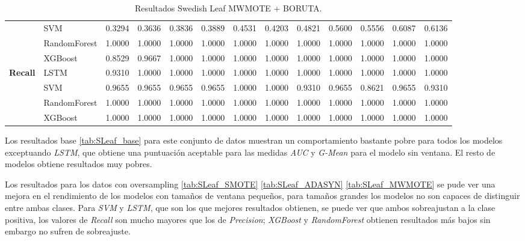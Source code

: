 \begin{table}[h]
\begin{adjustbox}{max width=15cm}
\begin{tabular}{|c|l|r|r|r|r|r|r|r|r|r|r|r|}
			& SVM &  0.3294 &  0.3636 &  0.3836 &  0.3889 &  0.4531 &  0.4203 &  0.4821 &  0.5600 &  0.5556 &  0.6087 &  0.6136 \\
			& RandomForest &  1.0000 &  1.0000 &  1.0000 &  1.0000 &  1.0000 &  1.0000 &  1.0000 &  1.0000 &  1.0000 &  1.0000 &  1.0000 \\
			& XGBoost &  0.8529 &  0.9667 &  1.0000 &  1.0000 &  1.0000 &  1.0000 &  1.0000 &  1.0000 &  1.0000 &  1.0000 &  1.0000 \\
			\hline
			\textbf{Recall} & LSTM &  0.9310 &  1.0000 &  1.0000 &  1.0000 &  1.0000 &  1.0000 &  1.0000 &  1.0000 &  1.0000 &  1.0000 &  1.0000 \\
			& SVM &  0.9655 &  0.9655 &  0.9655 &  0.9655 &  1.0000 &  1.0000 &  0.9310 &  0.9655 &  0.8621 &  0.9655 &  0.9310 \\
			& RandomForest &  1.0000 &  1.0000 &  1.0000 &  1.0000 &  1.0000 &  1.0000 &  1.0000 &  1.0000 &  1.0000 &  1.0000 &  1.0000 \\
			& XGBoost &  1.0000 &  1.0000 &  1.0000 &  1.0000 &  1.0000 &  1.0000 &  1.0000 &  1.0000 &  1.0000 &  1.0000 &  1.0000 \\
			\hline
		\end{tabular}
	\end{adjustbox}
	\caption{Resultados Swedish Leaf MWMOTE + BORUTA.}
	\label{tab:SLeaf_MWMOTE_BORUTA}
\end{table}
\newpage

Los resultados base \ref{tab:SLeaf_base} para este conjunto de datos muestran un comportamiento bastante pobre para todos los modelos exceptuando \textit{LSTM}, que obtiene una puntuación aceptable para las medidas \textit{AUC} y \textit{G-Mean} para el modelo sin ventana. El resto de modelos obtiene resultados muy pobres.\newline

Los resultados para los datos con oversampling \ref{tab:SLeaf_SMOTE} \ref{tab:SLeaf_ADASYN} \ref{tab:SLeaf_MWMOTE} se pude ver una mejora en el rendimiento de los modelos con tamaños de ventana pequeños, para tamaños grandes los modelos no son capaces de distinguir entre ambas clases. Para \textit{SVM} y \textit{LSTM}, que son los que mejores resultados obtienen, se puede ver que ambos sobreajustan a la clase positiva, los valores de \textit{Recall} son mucho mayores que los de \textit{Precision}; \textit{XGBoost} y \textit{RandomForest} obtienen resultados más bajos sin embargo no sufren de sobreajuste.\newline

